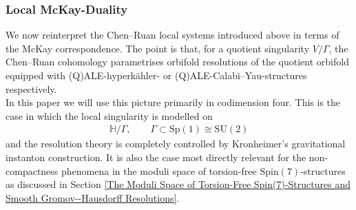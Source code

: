 \documentclass[psamsfonts]{amsart}
\theoremstyle{plain}
\theoremstyle{definition}{
\newtheorem{defi}{Definition}[section]
\newtheorem{ass}{Assumption}
\newtheorem*{nota}{Notation}}
\theoremstyle{remark}{
\newtheorem{rem}{Remark}
\newtheorem{ex}{Example}}
\theoremstyle{plain}{
\newtheorem{thm}{Theorem}[section]
\newtheorem{lem}{Lemma}[section]
\newtheorem{cor}{Corollary}[section]
\newtheorem{prop}{Proposition}[section]
\newtheorem{con}{Conjecture}[section]}
\newcommand{\m}[1]{{\mathrm{#1}}}
\begin{document}
    

















\subsubsection{Local McKay-Duality}
\label{Local McKay-Duality}

We now reinterpret the Chen--Ruan local systems introduced above in terms of the McKay correspondence. The point is that, for a quotient singularity $V/\Gamma$, the Chen--Ruan cohomology parametrises orbifold resolutions of the quotient orbifold equipped with (Q)ALE-hyperkähler- or (Q)ALE-Calabi--Yau-structures respectively. \\


In this paper we will use this picture primarily in codimension four. This is the case in which the local singularity is modelled on
\begin{align*}
\mathbb{H}/\Gamma,\qquad\Gamma\subset \m{Sp}(1)\cong\m{SU}(2)
\end{align*}
and the resolution theory is completely controlled by Kronheimer's \cite{kronheimer1989construction,kronheimer}
gravitational instanton construction. It is also the case most directly relevant for the non-compactness phenomena in the moduli space of torsion-free $\m{Spin}(7)$-structures as discussed in Section \ref{The Moduli Space of Torsion-Free Spin(7)-Structures and Smooth Gromov--Hausdorff Resolutions}.\\
\end{document}
